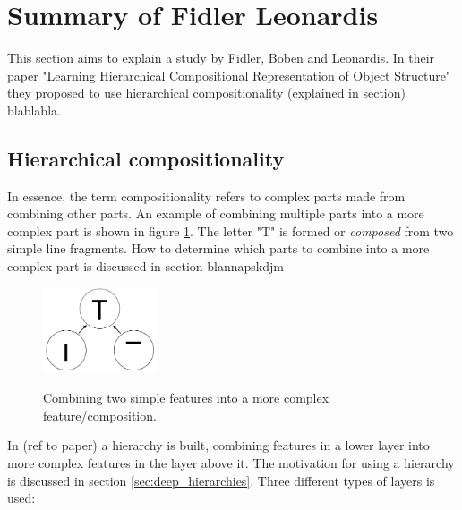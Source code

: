 \section{Summary of Fidler Leonardis }
\label{sec:fidler}
This section aims to explain a study by Fidler, Boben and Leonardis. 
In their paper "Learning Hierarchical Compositional Representation of Object Structure" they proposed to use hierarchical compositionality (explained in section) blablabla. 

\subsection{Hierarchical compositionality}
In essence, the term compositionality refers to complex parts made from combining other parts. 
An example of combining multiple parts into a more complex part is shown in figure \ref{fig:compositionality1}. 
The letter "T" is formed or \textit{composed} from two simple line fragments. 
How to determine which parts to combine into a more complex part is discussed in section blannapskdjm

\begin{figure}[h!] %
\centering
\includegraphics[width=0.3\textwidth]{graphics/compositionality1}
\label{fig:compositionality1}
\caption{Combining two simple features into a more complex feature/composition.}
\end{figure}

In (ref to paper) a hierarchy is built, combining features in a lower layer into more complex features in the layer above it. 
The motivation for using a hierarchy is discussed in section \ref{sec:deep_hierarchies}. 
Three different types of layers is used: 

